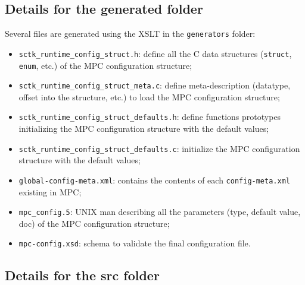 \documentclass{article}
\begin{document}
\subsection{Details for the generated folder}
\label{conf_gen_config}
Several files are generated using the XSLT in the \texttt{generators} folder:
\begin{itemize}
\item \texttt{sctk\_runtime\_config\_struct.h}: define all the C data structures (\texttt{struct}, \texttt{enum}, etc.) of the MPC configuration structure;
\item \texttt{sctk\_runtime\_config\_struct\_meta.c}: define meta-description (datatype, offset into the structure, etc.) to load the MPC configuration structure;
\item \texttt{sctk\_runtime\_config\_struct\_defaults.h}: define functions prototypes initializing the MPC configuration structure with the default values;
\item \texttt{sctk\_runtime\_config\_struct\_defaults.c}: initialize the MPC configuration structure with the default values;
\item \texttt{global-config-meta.xml}: contains the contents of each \texttt{config-meta.xml} existing in MPC;
\item \texttt{mpc\_config.5}: UNIX man describing all the parameters (type, default value, doc) of the MPC configuration structure;
\item \texttt{mpc-config.xsd}: schema to validate the final configuration file.
\end{itemize}

\subsection{Details for the src folder}
\label{conf_src_config}
\end{document}
